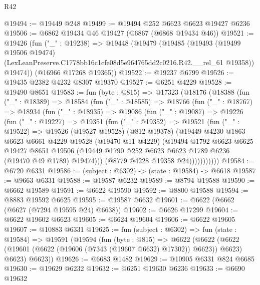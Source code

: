 \begin{lexlean}{R42}
\begin{coremodule}
{@19494 := @19449 @248
@19499 := @19494 @252 @6623 @6623 @19427 @6236
@19506 := @6862 @19434 @46 @19427 (@6867 (@6868 @19434 @46))
@19521 := @19426
    (fun ("_" : @19238) =>
    @19448
      (@19479
        (@19485
          (@19493
            (@19499 @19506 @19474)
            (LexLeanPreserve.C1778bb16c1cfe08d5e964765dd2c0216.R42.__rel_61 @19358))
          @19474))
      (@16966 @17268 @19365))
@19522 := @19237 @6799
@19526 := @19435 @2382 @4232 @8307 @19370
@19527 := @6251 @4229
@19528 := @19490 @8651
@19583 := fun (byte : @815) =>
  @17323
    (@18176
      (@18388
        (fun ("_" : @18389) =>
        @18584
          (fun ("_" : @18585) =>
          @18766
            (fun ("_" : @18767) =>
            @18934
              (fun ("_" : @18935) =>
              @19086
                (fun ("_" : @19087) =>
                @19226
                  (fun ("_" : @19227) =>
                  @19351
                    (fun ("_" : @19352) =>
                    @19521
                      (fun ("_" : @19522) =>
                      @19526
                        (@19527 @19528)
                        (@812 @19378)
                        (@19449
                          @4230
                          @1863
                          @6623
                          @6661
                          @4229
                          @19528
                          (@19470 @11 @4229)
                          (@19494
                            @1792
                            @6623
                            @6625
                            @19427
                            @8651
                            @19506
                            (@19449 @1790 @252 @6623 @6623 @1789 @6236 (@19470 @49 @1789) @19474)))
                        (@8779 @4228 @19358 @24)))))))))))
@19584 := @6720 @6331
@19586 := (subject : @6302) -> (state : @19584) -> @6618
@19587 := @9663 @6331
@19588 := @19587 @6232
@19589 := @8794 @19588
@19590 := @6662 @19589
@19591 := @6622 @19590
@19592 := @8800 @19588
@19594 := @8883 @19592 @6625
@19595 := @19587 @6632
@19601 := @6622 (@6662 (@6627 (@7294 @19595 @24) @6638))
@19602 := @6626 @17299
@19604 := @6622 @19602 @6623
@19605 := @6624 @19604
@19606 := @6622 @19605
@19607 := @10883 @6331
@19625 := fun (subject : @6302) =>
  fun (state : @19584) =>
  @19591
    (@19594
      (fun (byte : @815) =>
      @6622
        (@6622 (@6622 (@19601 (@6622 (@19606 (@7343 (@19607 @6632) @17302)) @6623)) @6623) @6623)
        @6623))
@19626 := @6683 @1482
@19629 := @10905 @6331 @824 @6685
@19630 := @19629 @6232
@19632 := @6251 @19630 @6236
@19633 := @6690 @19632
}
\end{coremodule}
\end{lexlean}
